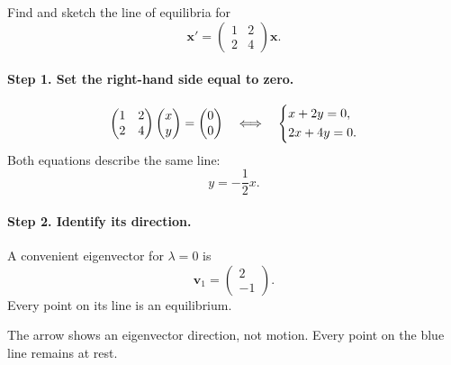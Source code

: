 \documentclass[10pt,letterpaper]{article}
\begin{document}
\begin{example}[4]{
Find and sketch the line of equilibria for
\[
\mathbf{x}'=
\begin{pmatrix}
1&2\\
2&4
\end{pmatrix}\mathbf{x}.
\]
}

\paragraph{Step 1. Set the right-hand side equal to zero.}
\[
\begin{pmatrix}
1&2\\
2&4
\end{pmatrix}
\begin{pmatrix}x\\y\end{pmatrix}
=\begin{pmatrix}0\\0\end{pmatrix}
\quad\Longleftrightarrow\quad
\begin{dcases}
x+2y=0,\\
2x+4y=0.
\end{dcases}
\]
Both equations describe the same line:
\[
\boxed{y=-\frac12x.}
\]

\paragraph{Step 2. Identify its direction.}
A convenient eigenvector for $\lambda=0$ is
\[
\mathbf{v}_1=\begin{pmatrix}2\\-1\end{pmatrix}.
\]
Every point on its line is an equilibrium.

\begin{center}

\small
The arrow shows an eigenvector direction, not motion.
Every point on the blue line remains at rest.
\end{center}
\end{example}
\end{document}

